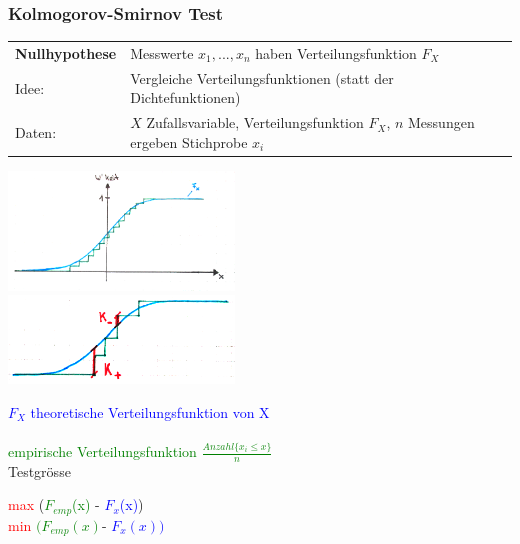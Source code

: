  	
	\subsubsection{Kolmogorov-Smirnov Test}
	\begin{tabular}{ll}
	\textbf{Nullhypothese} & Messwerte $x_1, ..., x_n$ haben Verteilungsfunktion $F_X$\\
    Idee: & Vergleiche Verteilungsfunktionen (statt der Dichtefunktionen)\\
    Daten: & $X$ Zufallsvariable, Verteilungsfunktion $F_X$, $n$ Messungen
    ergeben Stichprobe $x_i$
    \end{tabular}

	\begin{minipage}{6cm}
    \includegraphics[width=6cm]{./bilder/ks1.png}\\
    \includegraphics[width=6cm]{./bilder/ks2.png}\\
    \end{minipage}
	\begin{minipage}{12cm}
    \textcolor{blue}{$F_X$ theoretische Verteilungsfunktion von X}\\ \\
    \vspace{15mm}
    \textcolor{green}{empirische Verteilungsfunktion $\frac{Anzahl\{x_i \leq
    x \}}{n}$}\\

    Testgrösse\\
    \hspace*{0.5cm}
    	\parbox{6cm}{\textcolor{red}{max}
   			(\textcolor{green}{$F_{emp}$(x)} - 
   			\textcolor{blue}{$F_x$(x)})\\
    		\textcolor{red}{min} 
    		\textcolor{green}{$(F_{emp}(x)$}-
    		\textcolor{blue}{$F_x(x))$}}

    \end{minipage}

